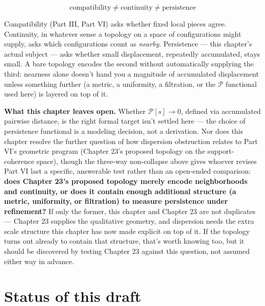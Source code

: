 \[\boxed{\text{compatibility} \neq \text{continuity} \neq \text{persistence}}\]

Compatibility (Part III, Part VI) asks whether fixed local pieces agree.
Continuity, in whatever sense a topology on a space of configurations
might supply, asks which configurations count as \emph{nearby}. Persistence ---
this chapter's actual subject --- asks whether small displacement,
repeatedly accumulated, stays small. A bare topology encodes the second
without automatically supplying the third: nearness alone doesn't hand
you a magnitude of accumulated displacement unless something further
(a metric, a uniformity, a filtration, or the \(\mathcal{P}\) functional
used here) is layered on top of it.

\textbf{What this chapter leaves open.} Whether \(\mathcal{P}[s] \to 0\), defined
via accumulated pairwise distance, is the right formal target isn't
settled here --- the choice of persistence functional is a modeling
decision, not a derivation. Nor does this chapter resolve the further
question of how dispersion obstruction relates to Part VI's geometric
program (Chapter 23's proposed topology on the support-coherence space),
though the three-way non-collapse above gives whoever revises Part VI
last a specific, answerable test rather than an open-ended comparison:
\textbf{does Chapter 23's proposed topology merely encode neighborhoods and
continuity, or does it contain enough additional structure (a metric,
uniformity, or filtration) to measure persistence under refinement?} If
only the former, this chapter and Chapter 23 are not duplicates --- Chapter
23 supplies the qualitative geometry, and dispersion needs the extra
scale structure this chapter has now made explicit on top of it. If the
topology turns out already to contain that structure, that's worth
knowing too, but it should be discovered by testing Chapter 23 against
this question, not assumed either way in advance.

\hypertarget{status-of-this-draft}{%
\section{Status of this draft}\label{status-of-this-draft}}

